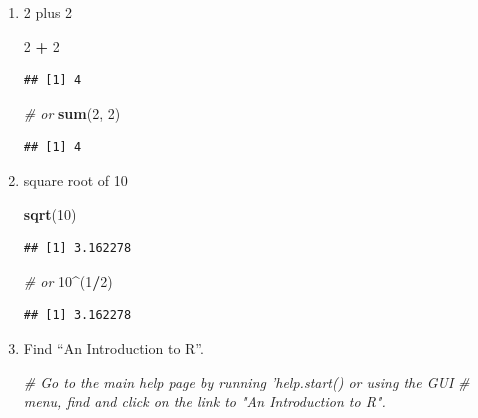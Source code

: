\documentclass[
]{book}
\newenvironment{Shaded}{\begin{snugshade}}{\end{snugshade}}
\newcommand{\CommentTok}[1]{\textcolor[rgb]{0.56,0.35,0.01}{\textit{#1}}}
\newcommand{\DecValTok}[1]{\textcolor[rgb]{0.00,0.00,0.81}{#1}}
\newcommand{\KeywordTok}[1]{\textcolor[rgb]{0.13,0.29,0.53}{\textbf{#1}}}
\newcommand{\NormalTok}[1]{#1}
\newcommand{\OperatorTok}[1]{\textcolor[rgb]{0.81,0.36,0.00}{\textbf{#1}}}
\newcommand{\StringTok}[1]{\textcolor[rgb]{0.31,0.60,0.02}{#1}}
\begin{document}
\begin{enumerate}
\def\labelenumi{\arabic{enumi}.}
\item
  2 plus 2

\begin{Shaded}
\begin{Highlighting}[]
\DecValTok{2} \OperatorTok{+}\StringTok{ }\DecValTok{2}
\end{Highlighting}
\end{Shaded}

\begin{verbatim}
## [1] 4
\end{verbatim}

\begin{Shaded}
\begin{Highlighting}[]
\CommentTok{# or}
\KeywordTok{sum}\NormalTok{(}\DecValTok{2}\NormalTok{, }\DecValTok{2}\NormalTok{)}
\end{Highlighting}
\end{Shaded}

\begin{verbatim}
## [1] 4
\end{verbatim}
\item
  square root of 10

\begin{Shaded}
\begin{Highlighting}[]
\KeywordTok{sqrt}\NormalTok{(}\DecValTok{10}\NormalTok{)}
\end{Highlighting}
\end{Shaded}

\begin{verbatim}
## [1] 3.162278
\end{verbatim}

\begin{Shaded}
\begin{Highlighting}[]
\CommentTok{# or}
\DecValTok{10}\OperatorTok{^}\NormalTok{(}\DecValTok{1}\OperatorTok{/}\DecValTok{2}\NormalTok{)}
\end{Highlighting}
\end{Shaded}

\begin{verbatim}
## [1] 3.162278
\end{verbatim}
\item
  Find ``An Introduction to R''.

\begin{Shaded}
\begin{Highlighting}[]
\CommentTok{# Go to the main help page by running 'help.start() or using the GUI}
\CommentTok{# menu, find and click on the link to "An Introduction to R".}
\end{Highlighting}
\end{Shaded}
\end{enumerate}
\end{document}
